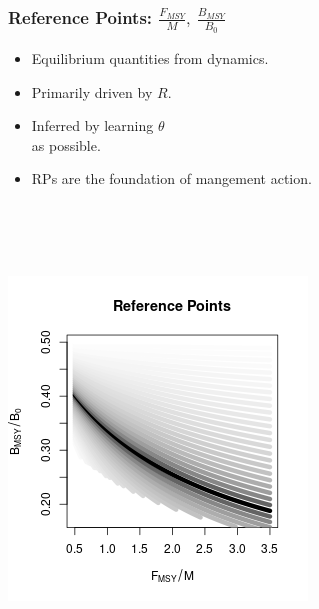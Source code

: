 \documentclass[a0paper,portrait]{baposter}
\begin{document}
\begin{poster}
{\begin{minipage}[h!]{0.55\textwidth}
\begin{minipage}[b]{0.48\textwidth}
		$~$\\$~$\\
	\end{minipage}
	
	\vspace*{-1.5cm}
	\subsubsection*{Reference Points: $\frac{F_{MSY}}{M}, ~\frac{B_{MSY}}{B_0}$}
	
	
        \begin{minipage}[b]{0.5\textwidth}
	\begin{itemize}[leftmargin=*]
		\raggedright
		\item Equilibrium quantities from dynamics.
		\item Primarily driven by $R$.
		\item Inferred by learning $\theta$\\ as possible. %
                \item RPs are the foundation of mangement action.
        \end{itemize}
	$~$\\$~$\\$~$\\
	\end{minipage}
        \begin{minipage}[b]{0.48\textwidth}
	\includegraphics[width=\textwidth]{../../ddBias/rpCurves.png} %

\end{minipage}
\end{minipage}}
\end{poster}
\end{document}
